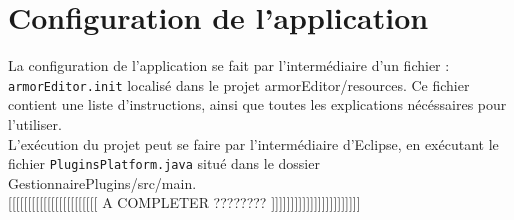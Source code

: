 \vspace{1.0cm}

\section{Configuration de l'application}

	La configuration de l'application se fait par l'intermédiaire d'un fichier : \texttt{armorEditor.init} localisé dans le projet armorEditor/resources. Ce fichier contient une liste d'instructions, ainsi que toutes les explications nécéssaires pour l'utiliser.\\

	L'exécution du projet peut se faire par l'intermédiaire d'Eclipse, en exécutant le fichier \texttt{PluginsPlatform.java} situé dans le dossier GestionnairePlugins/src/main.\\

	[[[[[[[[[[[[[[[[[[[[[[[ A COMPLETER ???????? ]]]]]]]]]]]]]]]]]]]]]]]
